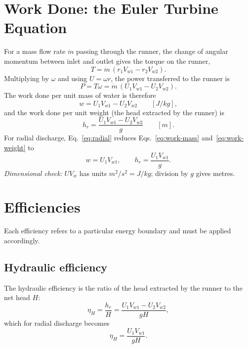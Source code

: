\documentclass[11pt,a4paper]{article}
\numberwithin{equation}{section}
\begin{document}
\section{Work Done: the Euler Turbine Equation}
\label{sec:euler}

For a mass flow rate $\dot m$ passing through the runner, the change of angular momentum between inlet and outlet gives the torque on the runner,
\begin{equation}
  T = \dot m\,(r_1 V_{w1} - r_2 V_{w2}).
  \label{eq:torque}
\end{equation}
Multiplying by $\omega$ and using $U = \omega r$, the power transferred to the runner is
\begin{equation}
  P = T\omega = \dot m\,(U_1 V_{w1} - U_2 V_{w2}).
  \label{eq:power}
\end{equation}
The work done per unit mass of water is therefore
\begin{equation}
  w = U_1 V_{w1} - U_2 V_{w2} \qquad [\si{J/kg}],
  \label{eq:work-mass}
\end{equation}
and the work done per unit weight (the head extracted by the runner) is
\begin{equation}
  h_r = \frac{U_1 V_{w1} - U_2 V_{w2}}{g} \qquad [\si{m}].
  \label{eq:work-weight}
\end{equation}
For radial discharge, Eq.~\eqref{eq:radial} reduces Eqs.~\eqref{eq:work-mass} and~\eqref{eq:work-weight} to
\begin{equation}
  w = U_1 V_{w1}, \qquad h_r = \frac{U_1 V_{w1}}{g}.
  \label{eq:work-radial}
\end{equation}
\emph{Dimensional check:} $UV_w$ has units $\si{m^2/s^2} = \si{J/kg}$; division by $g$ gives metres.

\section{Efficiencies}
\label{sec:efficiencies}

Each efficiency refers to a particular energy boundary and must be applied accordingly.

\subsection{Hydraulic efficiency}

The hydraulic efficiency is the ratio of the head extracted by the runner to the net head $H$:
\begin{equation}
  \eta_H = \frac{h_r}{H} = \frac{U_1 V_{w1} - U_2 V_{w2}}{gH},
  \label{eq:etaH}
\end{equation}
which for radial discharge becomes
\begin{equation}
  \eta_H = \frac{U_1 V_{w1}}{gH}.
  \label{eq:etaH-radial}
\end{equation}
\end{document}
